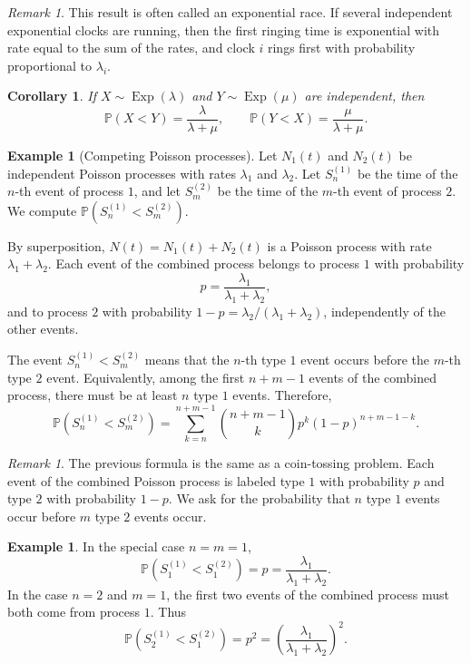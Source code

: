\documentclass[11pt]{article}
\theoremstyle{plain}
\newtheorem{corollary}[theorem]{Corollary}
\theoremstyle{definition}
\newtheorem{example}[theorem]{Example}
\theoremstyle{remark}
\newtheorem{remark}[theorem]{Remark}
\begin{document}
	
	\begin{remark}
		This result is often called an exponential race. If several independent exponential clocks are running, then the first ringing time is exponential with rate equal to the sum of the rates, and clock \(i\) rings first with probability proportional to \(\lambda_i\).
	\end{remark}
	
	\begin{corollary}
		If \(X\sim\operatorname{Exp}(\lambda)\) and \(Y\sim\operatorname{Exp}(\mu)\) are independent, then
		\[
		\mathbb{P}(X<Y)=\frac{\lambda}{\lambda+\mu},
		\qquad
		\mathbb{P}(Y<X)=\frac{\mu}{\lambda+\mu}.
		\]
	\end{corollary}
	
	\begin{example}[Competing Poisson processes]
		Let \(N_1(t)\) and \(N_2(t)\) be independent Poisson processes with rates \(\lambda_1\) and \(\lambda_2\). Let \(S_n^{(1)}\) be the time of the \(n\)-th event of process \(1\), and let \(S_m^{(2)}\) be the time of the \(m\)-th event of process \(2\). We compute \(\mathbb{P}(S_n^{(1)}<S_m^{(2)})\).
		
		By superposition, \(N(t)=N_1(t)+N_2(t)\) is a Poisson process with rate \(\lambda_1+\lambda_2\). Each event of the combined process belongs to process \(1\) with probability
		\[
		p=\frac{\lambda_1}{\lambda_1+\lambda_2},
		\]
		and to process \(2\) with probability \(1-p=\lambda_2/(\lambda_1+\lambda_2)\), independently of the other events.
		
		The event \(S_n^{(1)}<S_m^{(2)}\) means that the \(n\)-th type \(1\) event occurs before the \(m\)-th type \(2\) event. Equivalently, among the first \(n+m-1\) events of the combined process, there must be at least \(n\) type \(1\) events. Therefore,
		\[
		\mathbb{P}(S_n^{(1)}<S_m^{(2)})
		=
		\sum_{k=n}^{n+m-1}
		\binom{n+m-1}{k}p^k(1-p)^{n+m-1-k}.
		\]
	\end{example}
	
	\begin{remark}
		The previous formula is the same as a coin-tossing problem. Each event of the combined Poisson process is labeled type \(1\) with probability \(p\) and type \(2\) with probability \(1-p\). We ask for the probability that \(n\) type \(1\) events occur before \(m\) type \(2\) events occur.
	\end{remark}
	
	\begin{example}
		In the special case \(n=m=1\),
		\[
		\mathbb{P}(S_1^{(1)}<S_1^{(2)})
		=
		p
		=
		\frac{\lambda_1}{\lambda_1+\lambda_2}.
		\]
		In the case \(n=2\) and \(m=1\), the first two events of the combined process must both come from process \(1\). Thus
		\[
		\mathbb{P}(S_2^{(1)}<S_1^{(2)})
		=
		p^2
		=
		\left(\frac{\lambda_1}{\lambda_1+\lambda_2}\right)^2.
		\]
	\end{example}
	
\end{document}
